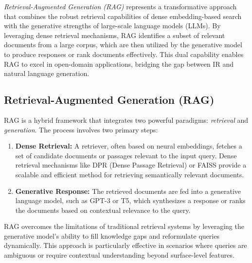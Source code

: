 \textit{Retrieval-Augmented Generation (RAG)} represents a transformative approach that combines the robust retrieval capabilities of dense embedding-based search with the generative strengths of large-scale language models (LLMs). By leveraging dense retrieval mechanisms, RAG identifies a subset of relevant documents from a large corpus, which are then utilized by the generative model to produce responses or rank documents effectively. This dual capability enables RAG to excel in open-domain applications, bridging the gap between IR and natural language generation.

\subsection{Retrieval-Augmented Generation (RAG)}
RAG is a hybrid framework that integrates two powerful paradigms: \textit{retrieval} and \textit{generation}. The process involves two primary steps:
\begin{enumerate}
    \item \textbf{Dense Retrieval:} A retriever, often based on neural embeddings, fetches a set of candidate documents or passages relevant to the input query. Dense retrieval mechanisms like DPR (Dense Passage Retrieval) or FAISS provide a scalable and efficient method for retrieving semantically relevant documents.
    \item \textbf{Generative Response:} The retrieved documents are fed into a generative language model, such as GPT-3 or T5, which synthesizes a response or ranks the documents based on contextual relevance to the query.
\end{enumerate}
RAG overcomes the limitations of traditional retrieval systems by leveraging the generative model’s ability to fill knowledge gaps and reformulate queries dynamically. This approach is particularly effective in scenarios where queries are ambiguous or require contextual understanding beyond surface-level features.

